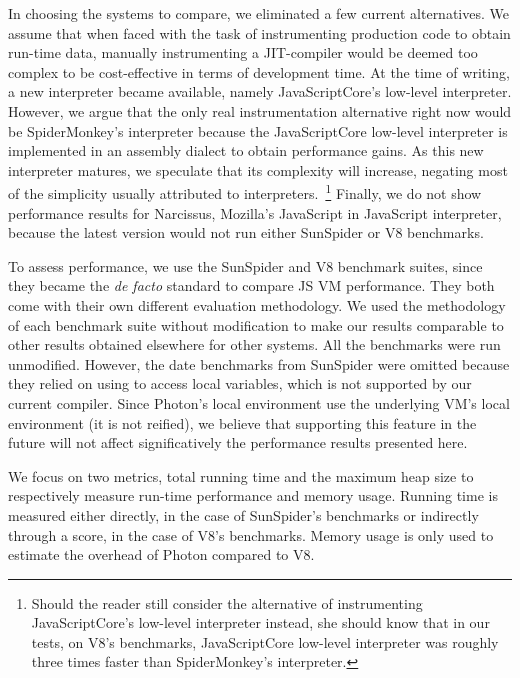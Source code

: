 In choosing the systems to compare, we eliminated a few current alternatives.
We assume that when faced with the task of instrumenting production code to
obtain run-time data, manually instrumenting a JIT-compiler would be deemed too
complex to be cost-effective in terms of development time. At the time of
writing, a new interpreter became available, namely JavaScriptCore's
low-level interpreter.  However, we argue that the only real instrumentation
alternative right now would be SpiderMonkey's interpreter because the
JavaScriptCore low-level interpreter is implemented in an assembly dialect to
obtain performance gains. As this new interpreter matures, we speculate that
its complexity will increase, negating most of the simplicity usually
attributed to interpreters.~\footnote{Should the reader still consider the
alternative of instrumenting JavaScriptCore's low-level interpreter instead,
she should know that in our tests, on V8's benchmarks, JavaScriptCore low-level
interpreter was roughly three times faster than SpiderMonkey's interpreter.}
Finally, we do not show performance results for Narcissus, Mozilla's JavaScript
in JavaScript interpreter, because the latest version would not run either
SunSpider or V8 benchmarks.

To assess performance, we use the SunSpider and V8 benchmark suites, since they
became the \textit{de facto} standard to compare JS VM performance. They both
come with their own different evaluation methodology. We used the methodology
of each benchmark suite without modification to make our results comparable to
other results obtained elsewhere for other systems. All the benchmarks were run
unmodified. However, the date benchmarks from SunSpider were omitted because
they relied on using  to access local variables, which is not
supported by our current compiler.  Since Photon's local environment use the
underlying VM's local environment (it is not reified), we believe that
supporting this feature in the future will not affect significatively the
performance results presented here.

We focus on two metrics, total running time and the maximum heap size to
respectively measure run-time performance and memory usage. Running time is
measured either directly, in the case of SunSpider's benchmarks or indirectly
through a score, in the case of V8's benchmarks. Memory usage is only used to
estimate the overhead of Photon compared to V8.

